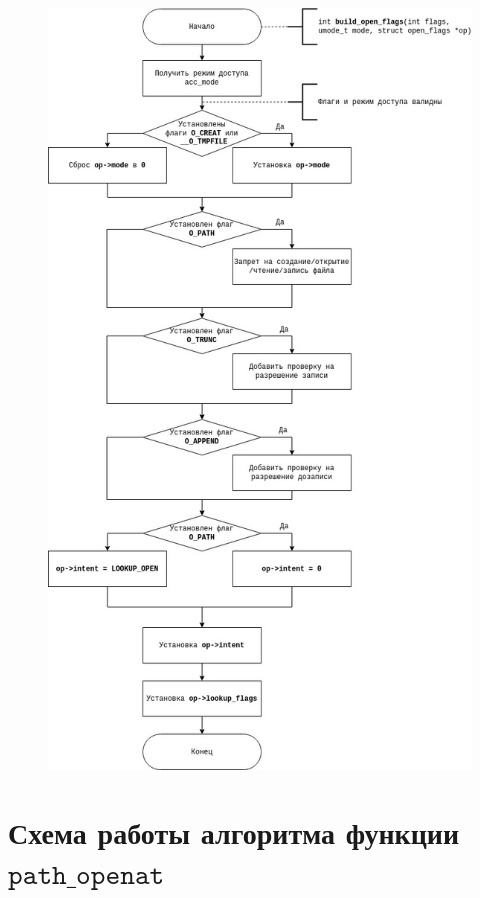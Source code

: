 \documentclass[a4paper,14pt]{extreport}
\begin{document}
\begin{figure}[H]
	\centering
	\includegraphics[scale=0.5]{img/build_open_flags.jpg}
	\label{fig:open_open_flags}
\end{figure}





\section{Схема работы алгоритма функции $\texttt{path\_openat}$}
\end{document}

